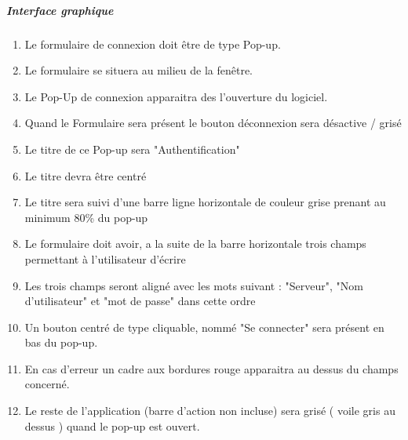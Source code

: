 \documentclass[10pt,a4paper]{report}
\begin{document}
	\subparagraph{Interface graphique}\label{ClientIGA} 
	\begin{enumerate}
		\item Le formulaire de connexion doit être de type Pop-up.
		\item Le formulaire se situera au milieu de la fenêtre.
		\item Le Pop-Up de connexion apparaitra des l'ouverture du logiciel.
		\item Quand le Formulaire sera présent le bouton déconnexion sera désactive / grisé
		\item Le titre de ce Pop-up sera "Authentification"
		\item Le titre devra être centré
		\item Le titre sera suivi d'une barre ligne horizontale de couleur grise prenant au minimum 80\% du pop-up
		\item Le formulaire doit avoir, a la suite de la barre horizontale trois champs permettant à l'utilisateur d'écrire
		\item Les trois champs seront aligné avec les mots suivant : "Serveur", "Nom d'utilisateur" et "mot de passe" dans cette ordre 
		\item Un bouton centré de type cliquable, nommé "Se connecter" sera présent en bas du pop-up.
		\item En cas d'erreur un cadre aux bordures rouge apparaitra au dessus du champs concerné.
		\item Le reste de l'application (barre d'action non incluse) sera grisé ( voile gris au dessus ) quand le pop-up est ouvert.
	\end{enumerate}
	
\end{document}
